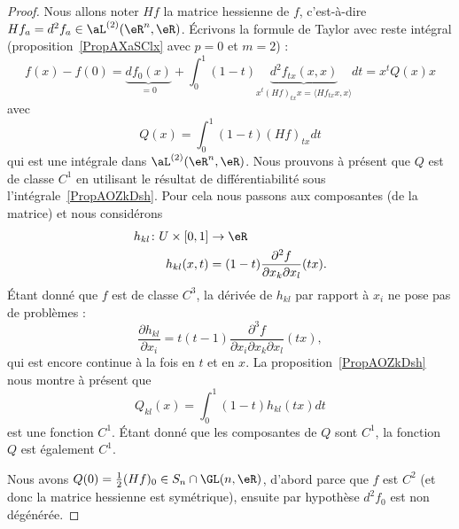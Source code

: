 \begin{proof}
    Nous allons noter \( Hf\) la matrice hessienne de \( f\), c'est-à-dire \( Hf_a=d^2f_a\in\aL^{(2)}(\eR^n,\eR)\). Écrivons la formule de Taylor avec reste intégral (proposition~\ref{PropAXaSClx} avec \( p=0\) et \( m=2\)) :
    \begin{equation}
        f(x)-f(0)=\underbrace{df_0(x)}_{=0}+\int_0^1(1-t)\underbrace{d^2f_{tx}(x,x)}_{x^t(Hf)_{tx}x=\langle Hf_{tx}x, x\rangle }dt=x^tQ(x)x
    \end{equation}
    avec
    \begin{equation}
        Q(x)=\int_0^1(1-t)(Hf)_{tx}dt
    \end{equation}
    qui est une intégrale dans \( \aL^{(2)}(\eR^n,\eR)\). Nous prouvons à présent que \( Q\) est de classe \( C^1\) en utilisant le résultat de différentiabilité sous l'intégrale~\ref{PropAOZkDsh}. Pour cela nous passons aux composantes (de la matrice) et nous considérons
    \begin{equation}
        \begin{aligned}
            h_{kl}\colon U\times\mathopen[ 0 , 1 \mathclose]&\to \eR \\
            h_{kl}(x,t)&=(1-t)\frac{ \partial^2f  }{ \partial x_k\partial x_l }(tx).
        \end{aligned}
    \end{equation}
    Étant donné que \( f\) est de classe \( C^3\), la dérivée de \( h_{kl}\) par rapport à \( x_i\) ne pose pas de problèmes :
    \begin{equation}
        \frac{ \partial h_{kl} }{ \partial x_i }=t(t-1)\frac{ \partial^3f  }{ \partial x_i\partial x_k\partial x_l }(tx),
    \end{equation}
    qui est encore continue à la fois en \( t\) et en \( x\). La proposition~\ref{PropAOZkDsh} nous montre à présent que
    \begin{equation}
        Q_{kl}(x)=\int_0^1(1-t)h_{kl}(tx)dt
    \end{equation}
    est une fonction \( C^1\). Étant donné que les composantes de \( Q\) sont \( C^1\), la fonction \( Q\) est également \( C^1\).

    Nous avons \( Q(0)=\frac{ 1 }{2}(Hf)_0\in S_n\cap \GL(n,\eR)\), d'abord parce que \( f\) est \( C^2\) (et donc la matrice hessienne est symétrique), ensuite par hypothèse \( d^2f_0\) est non dégénérée.


\end{proof}
